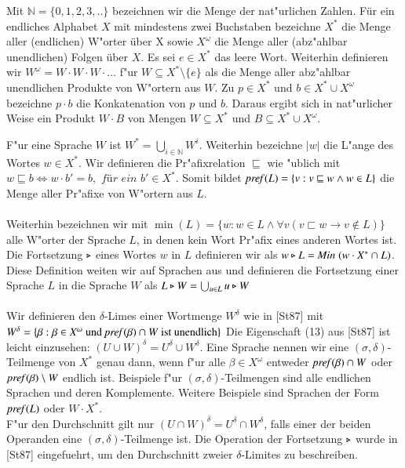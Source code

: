 Mit $\mathbb{N}=\{0,1,2,3,..\}$ bezeichnen wir die Menge der nat"urlichen Zahlen. 
Für ein endliches Alphabet $X$ mit mindestens zwei Buchstaben bezeichne $X^*$ die Menge aller (endlichen) W"orter über X sowie $X^\omega$ die Menge aller (abz"ahlbar unendlichen) Folgen über $X$.
Es sei $e\in X^*$ das leere Wort. Weiterhin definieren wir $W^\omega = W\cdot W\cdot W \cdot ...$ f"ur $W\subseteq X^*\setminus \{e\}$ als die Menge aller abz"ahlbar unendlichen Produkte von W"ortern aus $W$.
Zu $p\in X^*$ und $b\in X^*\cup X^\omega$ bezeichne $p\cdot b$ die Konkatenation von $p$ und $b$. Daraus ergibt sich in nat"urlicher Weise ein Produkt $W\cdot B$ von Mengen $W\subseteq X^*$ und $B\subseteq X^*\cup X^\omega$.

F"ur eine Sprache $W$ ist $W^*=\bigcup_{i\in\mathbb{N}} W^i$. Weiterhin bezeichne $\vert w\vert$ die L"ange des Wortes $w\in X^*$.
Wir definieren die Pr"afixrelation $\sqsubseteq$ wie "ublich mit $w\sqsubseteq b \Leftrightarrow w\cdot b' = b,\textit{ f{\"u}r ein }b'\in X^*$.
Somit bildet $\mathit{pref{(}}L) = \{v:v\sqsubseteq w \wedge w\in L\}$ die Menge aller Pr"afixe von W"ortern aus $L$.\\\\
Weiterhin bezeichnen wir mit $\min(L) = \{w:w\in L \wedge \forall v( v\sqsubset w \to v\notin L)\}$ alle W"orter der Sprache $L$, in denen kein Wort Pr"afix eines anderen Wortes ist.
Die Fortsetzung $\triangleright$ eines Wortes $w$ in $L$ definieren wir als $w\triangleright L = \mathit{Min}\;(w\cdot X^* \cap L)$. Diese Definition weiten wir auf Sprachen aus und definieren
die Fortsetzung einer Sprache $L$ in die Sprache $W$ als $L\triangleright W = \bigcup_{u\in L} u\triangleright W$\\\\
Wir definieren den $\delta$-Limes einer Wortmenge $W ^\delta$ wie in [St87] mit\\$W^\delta = \{\beta : \beta \in X^\omega \text{ und }\mathit{pref{(}}\beta)\cap W \text{ ist unendlich}\}$
Die Eigenschaft (13) aus [St87] ist leicht einzusehen: $(U \cup W)^\delta = U^\delta \cup W^\delta$.	Eine Sprache nennen wir eine $(\sigma,\delta)$-Teilmenge von $X^*$ genau dann, wenn f"ur alle $\beta \in X^\omega$ entweder $\mathit{pref{(}}\beta)\cap W$ oder $\mathit{pref{(}}\beta)\setminus W$ endlich ist.
Beispiele f"ur $(\sigma,\delta)$-Teilmengen sind alle endlichen Sprachen und deren Komplemente. Weitere Beispiele sind Sprachen der Form $\mathit{pref{(}}L)$ oder $W\cdot X^*$.\\
F"ur den Durchschnitt gilt nur $(U\cap W)^\delta = U^\delta \cap W^\delta$, falls einer der beiden Operanden eine $(\sigma,\delta)$-Teilmenge ist.
Die Operation der Fortsetzung $\triangleright$ wurde in [St87] eingefuehrt, um den Durchschnitt zweier $\delta$-Limites zu beschreiben.

